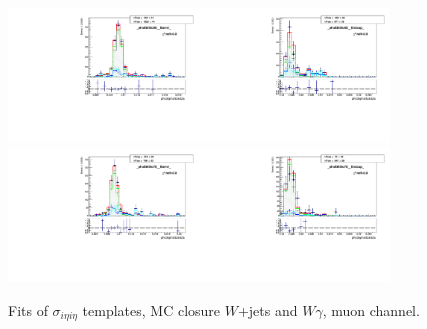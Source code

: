\begin{figure}[htb]
\begin{center}
   \includegraphics[width=0.45\textwidth]{../figs/figs_v11/MUON_WGamma/MCclosureWjetsPlusWg/c_TEMPL_SIHIH_UNblind__phoEt55to65__Barrel__RooFit_MCclosure.pdf}\includegraphics[width=0.45\textwidth]{../figs/figs_v11/MUON_WGamma/MCclosureWjetsPlusWg/c_TEMPL_SIHIH_UNblind__phoEt55to65__Endcap__RooFit_MCclosure.pdf}\\
   \includegraphics[width=0.45\textwidth]{../figs/figs_v11/MUON_WGamma/MCclosureWjetsPlusWg/c_TEMPL_SIHIH_UNblind__phoEt65to75__Barrel__RooFit_MCclosure.pdf}\includegraphics[width=0.45\textwidth]{../figs/figs_v11/MUON_WGamma/MCclosureWjetsPlusWg/c_TEMPL_SIHIH_UNblind__phoEt65to75__Endcap__RooFit_MCclosure.pdf}\\
  \label{fig:templateFits_MCclosureWjetsPlusWg_SIHIH_MUON_2}
  \caption{Fits of $\sigma_{i \eta i \eta}$ templates, MC closure $W$+jets and $W\gamma$, muon channel.}
  \end{center}
\end{figure}

